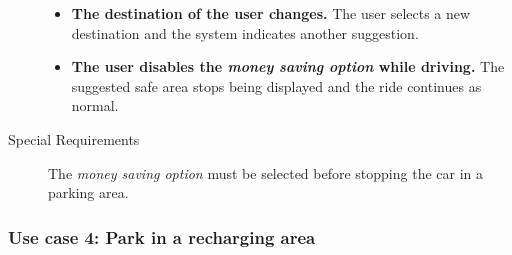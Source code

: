 \begin{description}
\begin{itemize}
				\item \textbf{The destination of the user changes.} The user selects a new destination and the system indicates another suggestion.
				\item \textbf{The user disables the \textit{money saving option} while driving.} The suggested safe area stops being displayed and the ride continues as normal.
			\end{itemize}
			\item[Special Requirements] The \textit{money saving option} must be selected before stopping the car in a parking area. %
		\end{description}

	\subsubsection{Use case 4: Park in a recharging area}
